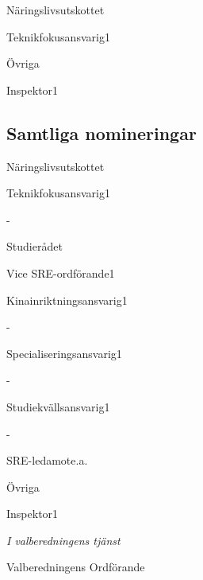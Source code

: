 \documentclass[../_main/handlingar.tex]{subfiles}
\begin{document}

\begin{valforslagslista}
    \begin{utskott}{Näringslivsutskottet}
        \begin{post}{Teknikfokusansvarig}{1}
        \end{post}
    \end{utskott}
    \begin{utskott}{Övriga}
        \begin{post}{Inspektor}{1}
        \end{post}
    \end{utskott}
\end{valforslagslista}

\subsection{Samtliga nomineringar}
\begin{valforslagslista}
    \begin{utskott}{Näringslivsutskottet}
        \begin{post}{Teknikfokusansvarig}{1}
            \item -
        \end{post}
    \end{utskott}
    \begin{utskott}{Studierådet}
        \begin{post}{Vice SRE-ordförande}{1}
        \end{post}
        \begin{post}{Kinainriktningsansvarig}{1}
            \item -
        \end{post}
        \begin{post}{Specialiseringsansvarig}{1}
            \item -
        \end{post}
        \begin{post}{Studiekvällsansvarig}{1}
            \item -
        \end{post}
        \begin{post}{SRE-ledamot}{e.a.}
        \end{post}
    \end{utskott}
    \begin{utskott}{Övriga}
        \begin{post}{Inspektor}{1}
        \end{post}
    \end{utskott}
\end{valforslagslista}

\begin{signatures}{1}
\emph{I valberedningens tjänst}
\signature{Elin Magnusson}{Valberedningens Ordförande}
\end{signatures}
\end{document}
